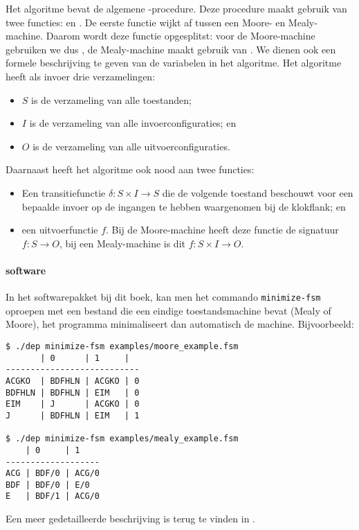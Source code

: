 Het algoritme bevat de algemene -procedure. Deze procedure maakt gebruik van twee functies:  en . De eerste functie wijkt af tussen een Moore- en Mealy-machine. Daarom wordt deze functie opgesplitst: voor de Moore-machine gebruiken we dus , de Mealy-machine maakt gebruik van . We dienen ook een formele beschrijving te geven van de variabelen in het algoritme. Het algoritme heeft als invoer drie verzamelingen:
\begin{itemize}
 \item $S$ is de verzameling van alle toestanden;
 \item $I$ is de verzameling van alle invoerconfiguraties; en
 \item $O$ is de verzameling van alle uitvoerconfiguraties.
\end{itemize}
Daarnaast heeft het algoritme ook nood aan twee functies:
\begin{itemize}
 \item Een transitiefunctie $\delta:S\times I\rightarrow S$ die de volgende toestand beschouwt voor een bepaalde invoer op de ingangen te hebben waargenomen bij de klokflank; en
 \item een uitvoerfunctie $f$. Bij de Moore-machine heeft deze functie de signatuur $f:S\rightarrow O$, bij een Mealy-machine is dit $f:S\times I\rightarrow O$.
\end{itemize}

\paragraph{software}
In het softwarepakket bij dit boek, kan men het commando \verb+minimize-fsm+ oproepen met een bestand die een eindige toestandsmachine bevat (Mealy of Moore), het programma minimaliseert dan automatisch de machine. Bijvoorbeeld:

\begin{verbatim}
$ ./dep minimize-fsm examples/moore_example.fsm
       | 0      | 1     |
---------------------------
ACGKO  | BDFHLN | ACGKO | 0
BDFHLN | BDFHLN | EIM   | 0
EIM    | J      | ACGKO | 0
J      | BDFHLN | EIM   | 1

$ ./dep minimize-fsm examples/mealy_example.fsm
    | 0     | 1
-------------------
ACG | BDF/0 | ACG/0
BDF | BDF/0 | E/0
E   | BDF/1 | ACG/0
\end{verbatim}


Een meer gedetailleerde beschrijving is terug te vinden in .

